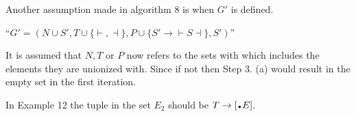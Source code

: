 Another assumption made in algorithm 8 is when $G'$ is defined.
\begin{center}
    ``$G' = (N \cup {S'}, T \cup \{\vdash, \dashv\}, P \cup \{S' \to \vdash S \dashv\}, S')$''
\end{center}
It is assumed that $N, T$ or $P$ now refers to the sets with which includes the elements they are unionized with. Since if not then Step 3. (a) would result in the empty set in the first iteration.

In Example 12 \cite[14]{Vagner2007} the tuple in the set $E_2$ should be $T \to [\bigdot E]$.